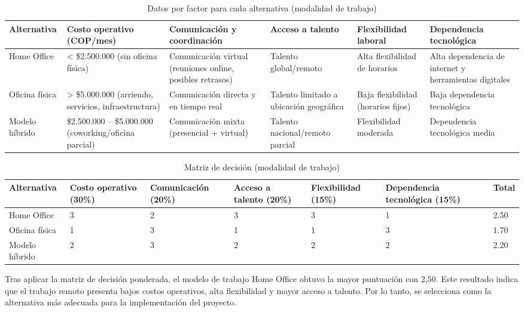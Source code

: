 \documentclass[12pt,a4paper]{article}
\begin{document}
\begin{table}[H]
\centering
\small
\begin{tabular}{p{2.5cm}p{2.5cm}p{2.5cm}p{2cm}p{2cm}p{2cm}}
\toprule
\textbf{Alternativa} & \textbf{Costo operativo (COP/mes)} & \textbf{Comunicación y coordinación} & \textbf{Acceso a talento} & \textbf{Flexibilidad laboral} & \textbf{Dependencia tecnológica} \\
\midrule
Home Office & < \$2.500.000 (sin oficina física) & Comunicación virtual (reuniones online, posibles retrasos) & Talento global/remoto & Alta flexibilidad de horarios & Alta dependencia de internet y herramientas digitales \\
\addlinespace
Oficina física & > \$5.000.000 (arriendo, servicios, infraestructura) & Comunicación directa y en tiempo real & Talento limitado a ubicación geográfica & Baja flexibilidad (horarios fijos) & Baja dependencia tecnológica \\
\addlinespace
Modelo híbrido & \$2.500.000 – \$5.000.000 (coworking/oficina parcial) & Comunicación mixta (presencial + virtual) & Talento nacional/remoto parcial & Flexibilidad moderada & Dependencia tecnológica media \\
\bottomrule
\end{tabular}
\caption{Datos por factor para cada alternativa (modalidad de trabajo)}
\end{table}

\begin{table}[H]
\centering
\begin{tabular}{p{2.5cm}p{1.5cm}p{1.5cm}p{1.5cm}p{1.5cm}p{1.5cm}p{1.5cm}}
\toprule
\textbf{Alternativa} & \textbf{Costo operativo (30\%)} & \textbf{Comunicación (20\%)} & \textbf{Acceso a talento (20\%)} & \textbf{Flexibilidad (15\%)} & \textbf{Dependencia tecnológica (15\%)} & \textbf{Total} \\
\midrule
Home Office & 3 & 2 & 3 & 3 & 1 & 2.50 \\
Oficina física & 1 & 3 & 1 & 1 & 3 & 1.70 \\
Modelo híbrido & 2 & 3 & 2 & 2 & 2 & 2.20 \\
\bottomrule
\end{tabular}
\caption{Matriz de decisión (modalidad de trabajo)}
\end{table}

Tras aplicar la matriz de decisión ponderada, el modelo de trabajo Home Office obtuvo la mayor puntuación con 2,50. Este resultado indica que el trabajo remoto presenta bajos costos operativos, alta flexibilidad y mayor acceso a talento. Por lo tanto, se selecciona como la alternativa más adecuada para la implementación del proyecto.
\end{document}
